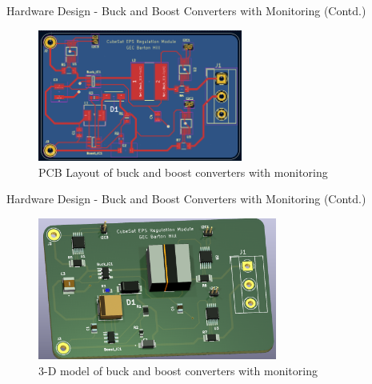 \documentclass[aspectratio=169]{beamer}
\begin{document}
		\begin{frame}{Hardware Design - Buck and Boost Converters with Monitoring (Contd.) }
			\begin{figure}[h]
				\centering
				\includegraphics[width=0.6\textwidth]{diag/1 pcb.png}
				\caption{PCB Layout of buck and boost converters with monitoring}
				\label{fig:bubo}
			\end{figure}
		\end{frame}
		\begin{frame}{Hardware Design - Buck and Boost Converters with Monitoring (Contd.) }
			\begin{figure}[h]
				\centering
				\includegraphics[width=0.7\textwidth]{diag/1 3d.png}
				\caption{3-D model of buck and boost converters with monitoring}
				\label{fig:bubo}
			\end{figure}
		\end{frame}
		
\end{document}
